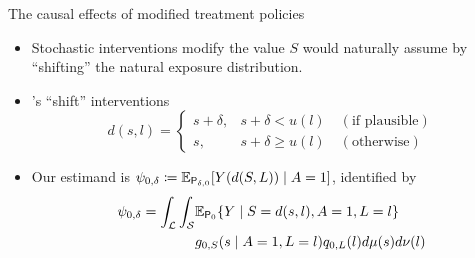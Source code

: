 \documentclass{beamer}
\begin{document}
\begin{frame}[c]{The causal effects of modified treatment policies}

\begin{center}
\begin{itemize}
  \itemsep8pt
  \item Stochastic interventions modify the value $S$ would naturally assume by
    ``shifting'' the natural exposure distribution.
  \item \cite{diaz2012population, diaz2018stochastic}'s ``shift''
    interventions\footnotemark
     \begin{equation*}\label{shift_intervention}
       d(s, l) =
         \begin{cases}
           s + \delta, & s + \delta < u(l) \quad (\text{if plausible}) \\
           s, & s + \delta \geq u(l) \quad (\text{otherwise})
         \end{cases}
     \end{equation*}
  \item Our estimand is $\psi_{0,\delta} \coloneqq
    \mathbb{E}_{\mathsf{P}_{\delta,0}}[Y(d(S,L)) \mid A = 1]$, identified by
    \begin{align*}\label{eqn:identification2012}
      \psi_{0,\delta} = \int_{\mathcal{L}} \int_{\mathcal{S}} &\mathbb{E}_{\mathsf{P}_0}
        \{Y \mid S = d(s, l), A = 1, L = l\} \\ &g_{0, S}(s \mid A = 1, L = l)
        q_{0, L}(l) d\mu(s)d\nu(l)
    \end{align*}
\end{itemize}
\end{center}



\end{frame}
\end{document}
